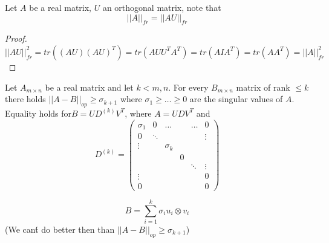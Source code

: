 \begin{claim}
Let $A$ be a real matrix, $U$ an orthogonal matrix, note that 
\[
\left|\left|A\right|\right|_{fr}=\left|\left|AU\right|\right|_{fr}
\]
\begin{proof}
$ $ 
\[
\left|\left|AU\right|\right|_{fr}^{2}=tr\left(\left(AU\right)\left(AU\right)^{T}\right)=tr\left(AUU^{T}A^{T}\right)=tr\left(AIA^{T}\right)=tr\left(AA^{T}\right)=\left|\left|A\right|\right|_{fr}^{2}
\]
\end{proof}
\end{claim}

\begin{thm}
Let $A_{m\times n}$ be a real matrix and let $k<m,n$. For every
$B_{m\times n}$ matrix of rank $\le k$ there holds $\left|\left|A-B\right|\right|_{op}\ge\sigma_{k+1}$
where $\sigma_{1}\ge\dots\ge0$ are the singular values of $A$. Equality
holds for$B=UD^{\left(k\right)}V^{T}$, where $A=UDV^{T}$ and 
\[
D^{\left(k\right)}=\left(\begin{array}{cccccc}
\sigma_{1} & 0 & \dots &  & \dots & 0\\
0 & \ddots &  &  &  & \vdots\\
\vdots &  & \sigma_{k}\\
 &  &  & 0\\
 &  &  &  & \ddots & \vdots\\
\vdots &  &  &  &  & 0\\
0 &  &  &  &  & 0
\end{array}\right)
\]
 
\[
B=\sum_{i=1}^{k}\sigma_{i}u_{i}\otimes v_{i}
\]
(We can\'{t} do better then than $\left|\left|A-B\right|\right|_{op}\ge\sigma_{k+1}$)
\end{thm}

